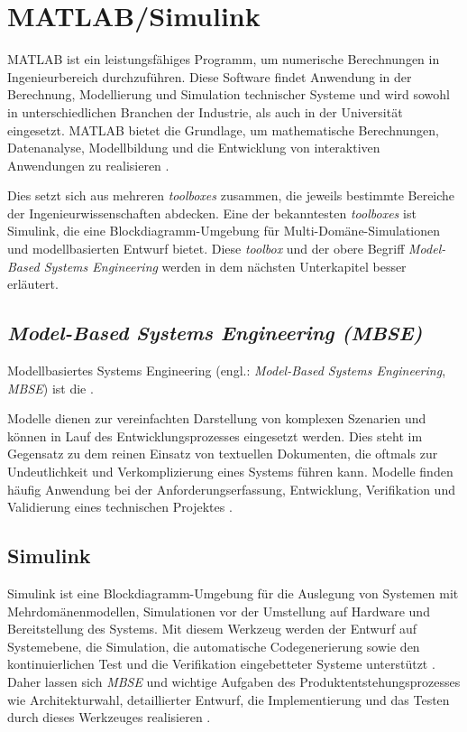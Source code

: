 \section{MATLAB/Simulink}
MATLAB ist ein leistungsfähiges Programm, um numerische Berechnungen in Ingenieurbereich durchzuführen. Diese Software findet Anwendung in der Berechnung, Modellierung und Simulation technischer Systeme und wird sowohl in unterschiedlichen Branchen der Industrie, als auch in der Universität eingesetzt. MATLAB bietet die Grundlage, um mathematische Berechnungen, Datenanalyse, Modellbildung und die Entwicklung von interaktiven Anwendungen zu realisieren \cite{boslEinfuhrungMATLABSimulink2020}.

Dies setzt sich aus mehreren \textit{toolboxes} zusammen, die jeweils bestimmte Bereiche der Ingenieurwissenschaften abdecken. Eine der bekanntesten \textit{toolboxes} ist Simulink, die eine Blockdiagramm-Umgebung für Multi-Domäne-Simulationen und modellbasierten Entwurf bietet. Diese \textit{toolbox} und der obere Begriff \textit{Model-Based Systems Engineering} werden in dem nächsten Unterkapitel besser erläutert.

\subsection{\textit{Model-Based Systems Engineering (MBSE)}}
Modellbasiertes Systems Engineering (engl.: \textit{Model-Based Systems Engineering}, \textit{MBSE}) ist die .

Modelle dienen zur vereinfachten Darstellung von komplexen Szenarien und können in Lauf des Entwicklungsprozesses eingesetzt werden. Dies steht im Gegensatz zu dem reinen Einsatz von textuellen Dokumenten, die oftmals zur Undeutlichkeit und Verkomplizierung eines Systems führen kann. Modelle finden häufig Anwendung bei der Anforderungserfassung, Entwicklung, Verifikation und Validierung eines technischen Projektes \cite{eignerModellbasierteVirtuelleProduktentwicklung2014}.

\subsection{Simulink}
Simulink ist eine Blockdiagramm-Umgebung für die Auslegung von Systemen mit Mehrdomänenmodellen, Simulationen vor der Umstellung auf Hardware und Bereitstellung des Systems. Mit diesem Werkzeug werden der Entwurf auf Systemebene, die Simulation, die automatische Codegenerierung sowie den kontinuierlichen Test und die Verifikation eingebetteter Systeme unterstützt \cite{themathworksinc.SimulinkGettingStarted}. Daher lassen sich \textit{MBSE} und wichtige Aufgaben des Produktentstehungsprozesses wie Architekturwahl, detaillierter Entwurf, die Implementierung und das Testen durch dieses Werkzeuges realisieren \cite{themathworksinc.SimulinkGettingStarted}.

